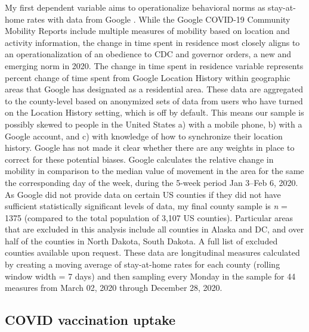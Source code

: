 My first dependent variable aims to operationalize behavioral norms as
stay-at-home rates with data from Google \citep{google2020}. While the Google
COVID-19 Community Mobility Reports include multiple measures of mobility based
on location and activity information, the change in time spent in residence most
closely aligns to an operationalization of an obedience to CDC and governor
orders, a new and emerging norm in 2020. The change in time spent in residence
variable represents percent change of time spent from Google Location History
within geographic areas that Google has designated as a residential area. These
data are aggregated to the county-level based on anonymized sets of data from
users who have turned on the Location History setting, which is off by default.
This means our sample is possibly skewed to people in the United States a) with
a mobile phone, b) with a Google account, and c) with knowledge of how to
synchronize their location history. Google has not made it clear whether there
are any weights in place to correct for these potential biases. Google
calculates the relative change in mobility in comparison to the median value of
movement in the area for the same the corresponding day of the week, during the
5-week period Jan 3--Feb 6, 2020. As Google did not provide data on certain US
counties if they did not have sufficient statistically significant levels of
data, my final county sample is \emph{n} = 1375 (compared to the total
population of 3,107 US counties). Particular areas that are excluded in this
analysis include all counties in Alaska and DC, and over half of the counties in
North Dakota, South Dakota. A full list of excluded counties available upon
request. These data are longitudinal measures calculated by creating a moving
average of stay-at-home rates for each county (rolling window width = 7 days)
and then sampling every Monday in the sample for 44 measures from March 02, 2020
through December 28, 2020.

\hypertarget{covid-vaccination-uptake}{%
\subsection{COVID vaccination uptake}\label{covid-vaccination-uptake}}



